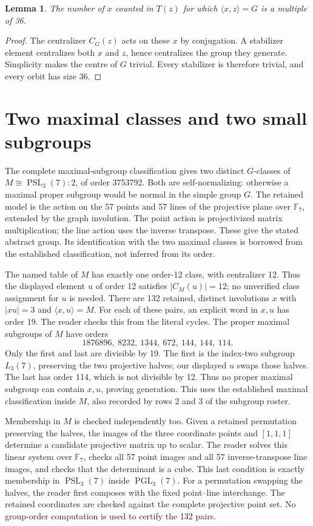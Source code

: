 \documentclass[11pt,a4paper]{article}
\newtheorem{lemma}{Lemma}\newtheorem{theorem}[lemma]{Theorem}
\begin{document}
\begin{lemma}\label{remainder}
The number of $x$ counted in $T(z)$ for which $\langle x,z\rangle=G$
is a multiple of 36.
\end{lemma}
\begin{proof}
The centralizer $C_G(z)$ acts on these $x$ by conjugation. A stabilizer
element centralizes both $x$ and $z$, hence centralizes the group they
generate. Simplicity makes the centre of $G$ trivial. Every stabilizer
is therefore trivial, and every orbit has size 36.
\end{proof}

\section{Two maximal classes and two small subgroups}
The complete maximal-subgroup classification gives two distinct
$G$-classes of $M\cong\operatorname{PSL}_3(7):2$, of order 3753792.
Both are self-normalizing: otherwise a maximal proper subgroup would
be normal in the simple group $G$.
The retained model is the action on the 57 points and 57 lines of the
projective plane over $\mathbb F_7$, extended by the graph involution.
The point action is projectivized matrix multiplication; the line
action uses the inverse transpose. These give the stated abstract
group. Its identification with the two maximal classes is borrowed
from the established classification, not inferred from its order.

The named table of $M$ has exactly one order-12 class, with centralizer
12. Thus the displayed element $u$ of order 12 satisfies $|C_M(u)|=12$;
no unverified class assignment for $u$ is needed. There are 132 retained, distinct involutions $x$ with
$|xu|=3$ and $\langle x,u\rangle=M$. For each of these pairs, an explicit word in $x,u$ has order 19.
The reader checks this from the literal cycles. The proper maximal
subgroups of $M$ have orders
\[
1876896,\ 8232,\ 1344,\ 672,\ 144,\ 144,\ 114.
\]
Only the first and last are divisible by 19. The first is the
index-two subgroup $L_3(7)$, preserving the two projective halves;
our displayed $u$ swaps those halves. The last has order 114,
which is not divisible by 12. Thus no proper maximal subgroup can
contain $x,u$, proving generation. This uses the established maximal
classification inside $M$, also recorded by rows 2 and 3 of the
subgroup roster.

Membership in $M$ is checked independently too. Given a retained
permutation preserving the halves, the images of the three coordinate
points and $[1,1,1]$ determine a candidate projective matrix up to scalar.
The reader solves this linear system over $\mathbb F_7$, checks all
57 point images and all 57 inverse-transpose line images, and checks
that the determinant is a cube. This last condition is exactly
membership in $\operatorname{PSL}_3(7)$ inside
$\operatorname{PGL}_3(7)$. For a permutation swapping the halves,
the reader first composes with the fixed point--line interchange.
The retained coordinates are checked against the complete projective
point set. No group-order computation is used to certify the 132 pairs.
\end{document}
